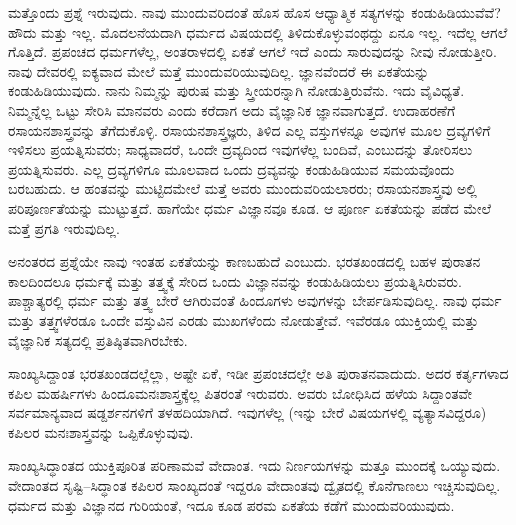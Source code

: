 ಮತ್ತೊಂದು ಪ್ರಶ್ನೆ ಇರುವುದು. ನಾವು ಮುಂದುವರಿದಂತೆ ಹೊಸ ಹೊಸ ಆಧ್ಯಾತ್ಮಿಕ ಸತ್ಯಗಳನ್ನು ಕಂಡುಹಿಡಿಯುವೆವೆ? ಹೌದು ಮತ್ತು ಇಲ್ಲ. ಮೊದಲನೆಯದಾಗಿ ಧರ್ಮದ ವಿಷಯದಲ್ಲಿ ತಿಳಿದುಕೊಳ್ಳುವಂಥದ್ದು ಏನೂ ಇಲ್ಲ. ಇದೆಲ್ಲ ಆಗಲೆ ಗೊತ್ತಿದೆ. ಪ್ರಪಂಚದ ಧರ್ಮಗಳೆಲ್ಲ, ಅಂತರಾಳದಲ್ಲಿ ಏಕತೆ ಆಗಲೆ ಇದೆ ಎಂದು ಸಾರುವುದನ್ನು ನೀವು ನೋಡುತ್ತೀರಿ. ನಾವು ದೇವರಲ್ಲಿ ಐಕ್ಯವಾದ ಮೇಲೆ ಮತ್ತೆ ಮುಂದುವರಿಯುವುದಿಲ್ಲ. ಜ್ಞಾನವೆಂದರೆ ಈ ಏಕತೆಯನ್ನು ಕಂಡುಹಿಡಿಯುವುದು. ನಾನು ನಿಮ್ಮನ್ನು ಪುರುಷ ಮತ್ತು ಸ್ತ್ರೀಯರನ್ನಾಗಿ ನೋಡುತ್ತಿರುವೆನು. ಇದು ವೈವಿಧ್ಯತೆ. ನಿಮ್ಮನ್ನೆಲ್ಲ ಒಟ್ಟು ಸೇರಿಸಿ ಮಾನವರು ಎಂದು ಕರೆದಾಗ ಅದು ವೈಜ್ಞಾನಿಕ ಜ್ಞಾನವಾಗುತ್ತದೆ. ಉದಾಹರಣೆಗೆ ರಸಾಯನಶಾಸ್ತ್ರವನ್ನು ತೆಗೆದುಕೊಳ್ಳಿ. ರಸಾಯನಶಾಸ್ತ್ರಜ್ಞರು, ತಿಳಿದ ಎಲ್ಲ ವಸ್ತುಗಳನ್ನೂ ಅವುಗಳ ಮೂಲ ದ್ರವ್ಯಗಳಿಗೆ ಇಳಿಸಲು ಪ್ರಯತ್ನಿಸುವರು; ಸಾಧ್ಯವಾದರೆ, ಒಂದೇ ದ್ರವ್ಯದಿಂದ ಇವುಗಳೆಲ್ಲ ಬಂದಿವೆ, ಎಂಬುದನ್ನು ತೋರಿಸಲು ಪ್ರಯತ್ನಿಸುವರು. ಎಲ್ಲ ದ್ರವ್ಯಗಳಿಗೂ ಮೂಲವಾದ ಒಂದು ದ್ರವ್ಯವನ್ನು ಕಂಡುಹಿಡಿಯುವ ಸಮಯವೊಂದು ಬರಬಹುದು. ಆ ಹಂತವನ್ನು ಮುಟ್ಟಿದಮೇಲೆ ಮತ್ತೆ ಅವರು ಮುಂದುವರಿಯಲಾರರು; ರಸಾಯನಶಾಸ್ತ್ರವು ಅಲ್ಲಿ ಪರಿಪೂರ್ಣತೆಯನ್ನು ಮುಟ್ಟುತ್ತದೆ. ಹಾಗೆಯೇ ಧರ್ಮ ವಿಜ್ಞಾನವೂ ಕೂಡ. ಆ ಪೂರ್ಣ ಏಕತೆಯನ್ನು ಪಡೆದ ಮೇಲೆ ಮತ್ತೆ ಪ್ರಗತಿ ಇರುವುದಿಲ್ಲ.

ಅನಂತರದ ಪ್ರಶ್ನೆಯೇ ನಾವು ಇಂತಹ ಏಕತೆಯನ್ನು ಕಾಣಬಹುದೆ ಎಂಬುದು. ಭರತಖಂಡದಲ್ಲಿ ಬಹಳ ಪುರಾತನ ಕಾಲದಿಂದಲೂ ಧರ್ಮಕ್ಕೆ ಮತ್ತು ತತ್ತ್ವಕ್ಕೆ ಸೇರಿದ ಒಂದು ವಿಜ್ಞಾನವನ್ನು ಕಂಡುಹಿಡಿಯಲು ಪ್ರಯತ್ನಿಸಿರುವರು. ಪಾಶ್ಚಾತ್ಯರಲ್ಲಿ ಧರ್ಮ ಮತ್ತು ತತ್ತ್ವ ಬೇರೆ ಆಗಿರುವಂತೆ ಹಿಂದೂಗಳು ಅವುಗಳನ್ನು ಬೇರ್ಪಡಿಸುವುದಿಲ್ಲ. ನಾವು ಧರ್ಮ ಮತ್ತು ತತ್ತ್ವಗಳೆರಡೂ ಒಂದೇ ವಸ್ತುವಿನ ಎರಡು ಮುಖಗಳೆಂದು ನೋಡುತ್ತೇವೆ. ಇವೆರಡೂ ಯುಕ್ತಿಯಲ್ಲಿ ಮತ್ತು ವೈಜ್ಞಾನಿಕ ಸತ್ಯದಲ್ಲಿ ಪ್ರತಿಷ್ಠಿತವಾಗಿರಬೇಕು.

ಸಾಂಖ್ಯಸಿದ್ದಾಂತ ಭರತಖಂಡದಲ್ಲೆಲ್ಲಾ, ಅಷ್ಟೇ ಏಕೆ, ಇಡೀ ಪ್ರಪಂಚದಲ್ಲೇ ಅತಿ ಪುರಾತನವಾದುದು. ಅದರ ಕರ್ತೃಗಳಾದ ಕಪಿಲ ಮಹರ್ಷಿಗಳು ಹಿಂದೂ\break ಮನಃಶಾಸ್ತ್ರಕ್ಕೆಲ್ಲ ಪಿತರಂತೆ ಇರುವರು. ಅವರು ಬೋಧಿಸಿದ ಹಳೆಯ ಸಿದ್ದಾಂತವೇ ಸರ್ವಮಾನ್ಯವಾದ ಷಡ್ದರ್ಶನಗಳಿಗೆ ತಳಹದಿಯಾಗಿದೆ. ಇವುಗಳೆಲ್ಲ (ಇನ್ನು ಬೇರೆ ವಿಷಯಗಳಲ್ಲಿ ವ್ಯತ್ಯಾಸವಿದ್ದರೂ) ಕಪಿಲರ ಮನಃಶಾಸ್ತ್ರವನ್ನು ಒಪ್ಪಿಕೊಳ್ಳುವುವು.

ಸಾಂಖ್ಯಸಿದ್ಧಾಂತದ ಯುಕ್ತಿಪೂರಿತ ಪರಿಣಾಮವೆ ವೇದಾಂತ. ಇದು ನಿರ್ಣಯಗಳನ್ನು ಮತ್ತೂ ಮುಂದಕ್ಕೆ ಒಯ್ಯುವುದು. ವೇದಾಂತದ ಸೃಷ್ಟಿ–ಸಿದ್ಧಾಂತ  ಕಪಿಲರ ಸಾಂಖ್ಯದಂತೆ ಇದ್ದರೂ ವೇದಾಂತವು ದ್ವೈತದಲ್ಲಿ ಕೊನೆಗಾಣಲು ಇಚ್ಚಿಸುವುದಿಲ್ಲ. ಧರ್ಮದ ಮತ್ತು ವಿಜ್ಞಾನದ ಗುರಿಯಂತೆ, ಇದೂ ಕೂಡ ಪರಮ ಏಕತೆಯ ಕಡೆಗೆ ಮುಂದುವರಿಯುವುದು.

